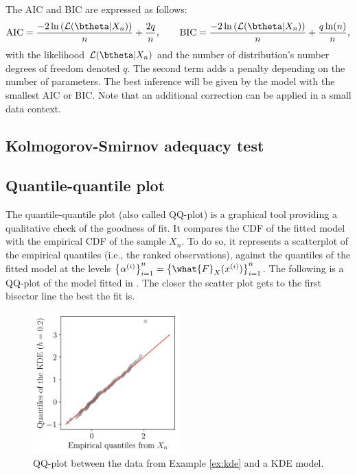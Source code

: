The AIC and BIC are expressed as follows:
\begin{equation}
    \textrm{AIC} = \frac{-2 \ln\left(\mathcal{L}(\btheta|X_n)\right)}{n} + \frac{2 q}{n},\qquad
    \textrm{BIC} = \frac{-2 \ln\left(\mathcal{L}(\btheta|X_n)\right)}{n} + \frac{q \ln(n)}{n},
\end{equation}
with the likelihood $\mathcal{L}(\btheta|X_n)$ and the number of distribution's number degrees of freedom denoted $q$.
The second term adds a penalty depending on the number of parameters. 
The best inference will be given by the model with the smallest AIC or BIC. 
Note that an additional correction can be applied in a small data context.

\subsection*{Kolmogorov-Smirnov adequacy test}



\subsection*{Quantile-quantile plot}

The quantile-quantile plot (also called QQ-plot) is a graphical tool providing a qualitative check of the goodness of fit.
It compares the CDF of the fitted model with the empirical CDF of the sample $X_n$.
To do so, it represents a scatterplot of the empirical quantiles (i.e., the ranked observations), against the quantiles of the fitted model at the levels 
$\left\{\alpha^{(i)}\right\}_{i=1}^n = \left\{\what{F}_X(x^{(i)})\right\}_{i=1}^n$.
The following  is a QQ-plot of the model fitted in . The closer the scatter plot gets to the first bisector line the best the fit is.

\begin{figure}[ht]
    \centering
    \includegraphics[width=0.5\textwidth]{../numerical_experiments/chapter1/figures/qqplot.png}
    \caption{QQ-plot between the data from Example \ref{ex:kde} and a KDE model.}
    \label{fig:qqplot_kde}
\end{figure}



